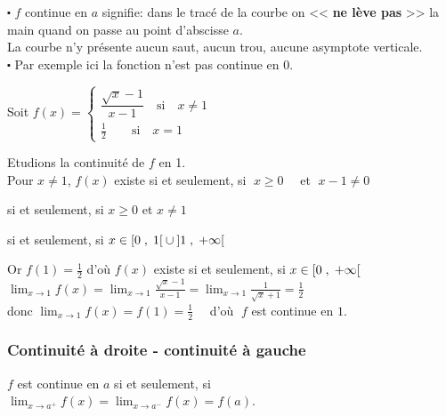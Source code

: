 {\color{red}$\centerdot$} $f$ continue en $a$ signifie: dans le tracé de la courbe on << \textbf{\color{magenta} ne lève pas }>> la main quand on passe au point d'abscisse $a.$ \\
La courbe n'y présente aucun saut, aucun trou, aucune asymptote verticale.\\

{\color{red}$\centerdot$} Par exemple ici la fonction n'est pas continue en $0.$

\begin{example}
Soit $ f (x)=\left\{\begin{array}{l} \dfrac{\sqrt{x}-1}{x-1}\quad \textrm{si} \quad x\neq 1 \\ \frac{1}{2}\quad \quad\textrm{si}\quad x= 1  \end{array} \right.$


Etudions la continuité   de $ f $ en 1.\\
 Pour $x\neq 1  $, $ f(x) $ existe si et seulement, si $\; x\geq 0 \quad$ et $\; x-1 \neq 0 $
 
si et seulement, si \quad $x\geq 0$ \quad   et $x\neq 1$

si et seulement, si $x\in \left[0 \;,\; 1\right[\cup\left]1 \;,\; +\infty\right[$

Or $ f(1)= \frac{1}{2}$  d'où $ f(x) $ existe si et seulement, si  $x\in \left[0 \;,\; +\infty\right[  $ \\
$ \displaystyle\lim_{x \to 1}f(x)=\displaystyle\lim_{x \to 1}\frac{\sqrt{x}-1}{x-1}= \displaystyle\lim_{x \to 1}\frac{1}{\sqrt{x}+1}= \frac{1}{2}$ \\donc $\displaystyle \lim_{x \to 1}f(x)=f(1)=\frac{1}{2}\quad$ d'où $\; f $ est continue en $ 1. $
\end{example}

\subsubsection*{ Continuité à droite - continuité à gauche}
\begin{property}
$ f $ est continue en $ a $ si et seulement, si  $\displaystyle \lim_{x \to a^{+}}f(x)=\displaystyle\lim_{x \to a^{-}}f(x)=f(a) $. 
\end{property}

